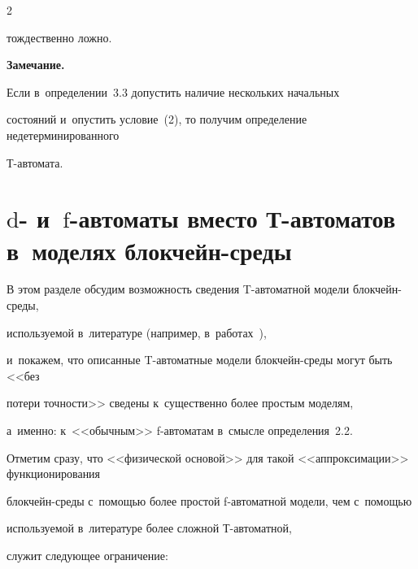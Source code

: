 \begin{multicols}{2}
\begin{enumerate}[(1)]
тождественно ложно.


\end{enumerate}








\noindent


\textbf{Замечание.}\


Если в~определении~3.3 допустить наличие нескольких начальных


состояний и~опустить условие~(2), то получим определение недетерминированного


Т-ав\-то\-мата.





\vspace*{-6pt}





\section{$\mathrm d$- и~$\mathrm f$-автоматы вместо Т-автоматов в~моделях блокчейн-среды}


\label{sec:T-block}





\vspace*{-3pt}





В этом разделе обсудим возможность сведения T-ав\-то\-мат\-ной модели блок\-чейн-сре\-ды,


используемой в~литературе (например, в~работах~\cite{Bitcoin-contract-model,Model-bitcoin-uppaal}),


и~покажем, что описанные T-ав\-то\-мат\-ные  модели блок\-чейн-среды могут быть <<без


потери точ\-ности>>  сведены  к~существенно более простым моделям,


а~именно: к~<<обычным>>  \mbox{f-ав}\-то\-ма\-там в~смысле определения~2.2.


Отметим сразу, что <<физической основой>> для такой <<аппроксимации>> функционирования


блокчейн-среды с~помощью более простой \mbox{f-ав}\-то\-мат\-ной модели, чем  с~помощью


используемой в~литературе более сложной \mbox{Т-ав}\-то\-мат\-ной,


служит следующее ограничение:



\end{multicols}
